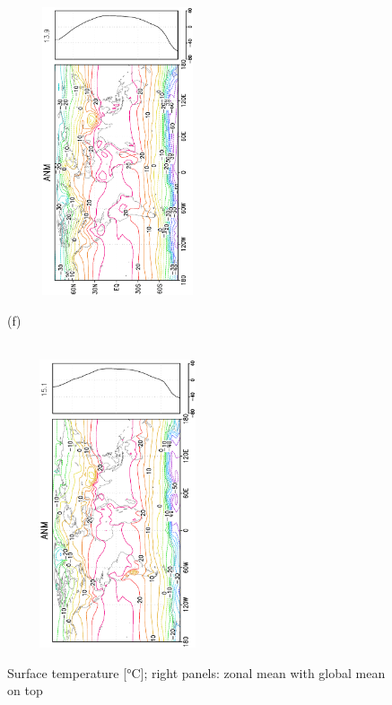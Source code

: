 \documentclass[12pt,a4paper,twoside,openright,headinclude,liststotoc,bibtotoc]{scrreprt}
\begin{document}
\begin{figure}[H]
{\includegraphics[height=8.5cm,width=6.5cm,angle=-90]
{eps/zonalceltmtemp139.eps}
}
\parbox{8.5cm}{\hspace{0.25cm}\begin{scriptsize}(f)\end{scriptsize} \vspace{-0.7cm} \\
\includegraphics[height=8.5cm,width=6.5cm,angle=-90]
{eps/zonalt21celtmsoil.eps}
}
\caption[Surface temperature]{Surface temperature [°C]; right panels: zonal mean with global mean on top}
\label{img:surftemp}
\end{figure}
\end{document}
